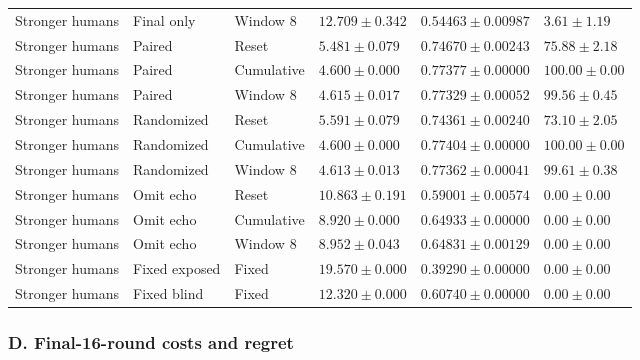 \begin{longtable}{@{}llllll@{}}
Stronger humans & Final only & Window 8 & $12.709 \pm 0.342$ & $0.54463 \pm 0.00987$ & $3.61 \pm 1.19$ \\
Stronger humans & Paired & Reset & $5.481 \pm 0.079$ & $0.74670 \pm 0.00243$ & $75.88 \pm 2.18$ \\
Stronger humans & Paired & Cumulative & $4.600 \pm 0.000$ & $0.77377 \pm 0.00000$ & $100.00 \pm 0.00$ \\
Stronger humans & Paired & Window 8 & $4.615 \pm 0.017$ & $0.77329 \pm 0.00052$ & $99.56 \pm 0.45$ \\
Stronger humans & Randomized & Reset & $5.591 \pm 0.079$ & $0.74361 \pm 0.00240$ & $73.10 \pm 2.05$ \\
Stronger humans & Randomized & Cumulative & $4.600 \pm 0.000$ & $0.77404 \pm 0.00000$ & $100.00 \pm 0.00$ \\
Stronger humans & Randomized & Window 8 & $4.613 \pm 0.013$ & $0.77362 \pm 0.00041$ & $99.61 \pm 0.38$ \\
Stronger humans & Omit echo & Reset & $10.863 \pm 0.191$ & $0.59001 \pm 0.00574$ & $0.00 \pm 0.00$ \\
Stronger humans & Omit echo & Cumulative & $8.920 \pm 0.000$ & $0.64933 \pm 0.00000$ & $0.00 \pm 0.00$ \\
Stronger humans & Omit echo & Window 8 & $8.952 \pm 0.043$ & $0.64831 \pm 0.00129$ & $0.00 \pm 0.00$ \\
Stronger humans & Fixed exposed & Fixed & $19.570 \pm 0.000$ & $0.39290 \pm 0.00000$ & $0.00 \pm 0.00$ \\
Stronger humans & Fixed blind & Fixed & $12.320 \pm 0.000$ & $0.60740 \pm 0.00000$ & $0.00 \pm 0.00$ \\
\end{longtable}\endgroup
\subsubsection*{D. Final-16-round costs and regret}
\begingroup\footnotesize\setlength{\tabcolsep}{4pt}

